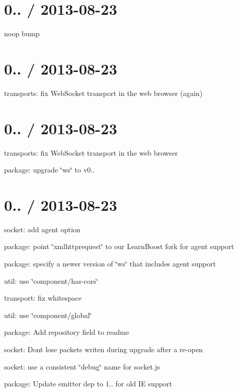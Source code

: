 \section*{0.. / 2013-\/08-\/23 }


\begin{DoxyItemize}
\item noop bump
\end{DoxyItemize}

\section*{0.. / 2013-\/08-\/23 }


\begin{DoxyItemize}
\item transports\+: fix Web\+Socket transport in the web browser (again)
\end{DoxyItemize}

\section*{0.. / 2013-\/08-\/23 }


\begin{DoxyItemize}
\item transports\+: fix Web\+Socket transport in the web browser
\item package\+: upgrade \char`\"{}ws\char`\"{} to v0..
\end{DoxyItemize}

\section*{0.. / 2013-\/08-\/23 }


\begin{DoxyItemize}
\item socket\+: add {\ttfamily agent} option
\item package\+: point \char`\"{}xmlhttprequest\char`\"{} to our Learn\+Boost fork for agent support
\item package\+: specify a newer version of \char`\"{}ws\char`\"{} that includes {\ttfamily agent} support
\item util\+: use \char`\"{}component/has-\/cors\char`\"{}
\item transport\+: fix whitespace
\item util\+: use \char`\"{}component/global\char`\"{}
\item package\+: Add repository field to readme
\item socket\+: Don\textquotesingle{}t lose packets writen during upgrade after a re-\/open
\item socket\+: use a consistent \char`\"{}debug\char`\"{} name for socket.\+js
\item package\+: Update emitter dep to 1.. for old IE support
\end{DoxyItemize}

